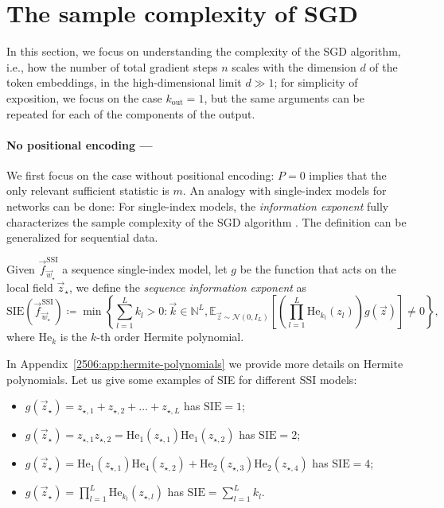 \section{The sample complexity of SGD}
In this section, we focus on understanding the complexity of the SGD algorithm, i.e., how the number of total gradient steps \(n\) scales with the dimension \(d\) of the token embeddings, in the high-dimensional limit \(d\gg 1\); for simplicity of exposition, we focus on the case \(k_\mathrm{out}=1\), but the same arguments can be repeated for each of the components of the output.  

\paragraph{No positional encoding ---} We first focus on the case without positional encoding: \(P=0\) implies that the only relevant sufficient statistic is \(m\). An analogy with single-index models for networks can be done: For single-index models, the \emph{information exponent} fully characterizes the sample complexity of the SGD algorithm \cite{arous2021online}. The definition can be generalized for sequential data.
\begin{definition} \label{2506:def:sie}
    Given \(\vec{f}^\mathrm{SSI}_{\vec w_{\star}}\) a sequence single-index model, let \(g\) be the function that acts on the local field \(\vec{z}_\star\), we define the \emph{sequence information exponent} as
    \[
        \text{SIE}(\vec{f}^\mathrm{SSI}_{\vec w_{\star}}) \coloneqq
            \min \left\{
                \sum^L_{l=1}k_l > 0 \colon
                    \vec{k}\in\mathbb{N}^L,
                    \mathbb{E}_{\vec{z}\sim\mathcal{N}(0,I_L)}\left[
                        \left(\prod^L_{l=1}\mathrm{He}_{k_l}(z_l)\right)g(\vec{z})
                    \right] \neq 0
            \right\},
    \]
    where \(\mathrm{He}_k\) is the \(k\)-th order Hermite polynomial.
\end{definition}
In Appendix~\ref{2506:app:hermite-polynomials} we provide more details on Hermite polynomials.
Let us give some examples of SIE for different SSI models:
\begin{itemize}
    \item \(g(\vec{z}_\star) = z_{\star,1} + z_{\star,2} + \dots + z_{\star,L}\) has \(\text{SIE} = 1\);
    \item \(g(\vec{z}_\star) = z_{\star,1}z_{\star,2} = \mathrm{He}_1(z_{\star,1})\mathrm{He}_1(z_{\star,2})\) has \(\text{SIE} = 2\);
    \item \(g(\vec{z}_\star) = \mathrm{He}_1(z_{\star,1})\mathrm{He}_4(z_{\star,2})+\mathrm{He}_2(z_{\star,3})\mathrm{He}_2(z_{\star,4})\) has \(\text{SIE} = 4\);
    \item \(g(\vec{z}_\star) = \prod_{l=1}^L \mathrm{He}_{k_l}(z_{\star,l})\) has \(\text{SIE} = \sum_{l=1}^L k_l\).
\end{itemize}
